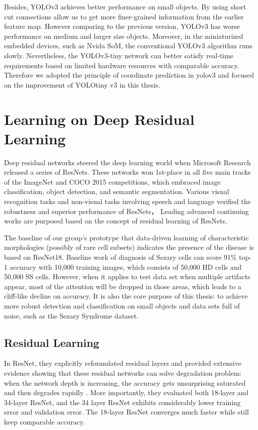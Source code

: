 Besides, YOLOv3 achieves better performance on small objects. By using short cut connections allow us to get more ﬁner-grained information from the earlier feature map. However comparing to the previous version, YOLOv3 has worse performance on medium and larger size objects.
Moreover, in the miniaturized embedded devices, such as Nvida SoM, the conventional YOLOv3 algorithm runs slowly. Nevertheless, the YOLOv3-tiny network can better satisfy real-time requirements based on limited hardware resources with comparable accuracy. Therefore we adopted the principle of coordinate prediction in yolov3 and focused on the improvement of YOLOtiny v3 in this thesis.

\section{Learning on Deep Residual Learning}

Deep residual networks \cite{20} steered the deep learning world when Microsoft Research released a series of ResNets. These networks won 1st-place  in all five main tracks of the ImageNet and COCO 2015 competitions, which embraced image classification, object detection, and semantic segmentation\cite{20}. Various visual recognition tasks and non-visual tasks involving speech and language verified the robustness and superior performance of ResNets， Leading advanced continuing works are purposed based on the concept of residual learning of ResNets\cite{20}.

The baseline of our group's prototype that data-driven learning of characteristic morphologies (possibly of rare cell subsets) indicates the presence of the disease is based on ResNet18\cite{20}. 
Baseline work of diagnosis of Sezary cells can score 91\% top-1 accuracy with 10,000 training images, which consists of 50,000 HD cells and  50,000 SS cells. However, when it applies to test data set when multiple artifacts appear, most of the attention will be dropped in those areas, which leads to a cliff-like decline on accuracy. It is also the core purpose of this thesis: to achieve more robust detection and classification on small objects and data sets full of noise, such as the Sezary Syndrome dataset.


\subsection{ Residual Learning }


In ResNet\cite{20}, they explicitly reformulated residual layers and provided extensive evidence showing that these residual networks can solve degradation problem: when the network depth is increasing, the accuracy gets unsurprising saturated and then degrades rapidly \cite{20}.
More importantly, they evaluated both 18-layer and 34-layer ResNet, and the 34 layer ResNet exhibits considerably lower training error and validation error. The 18-layer ResNet\cite{20} converges much faster while still keep comparable accuracy. 

